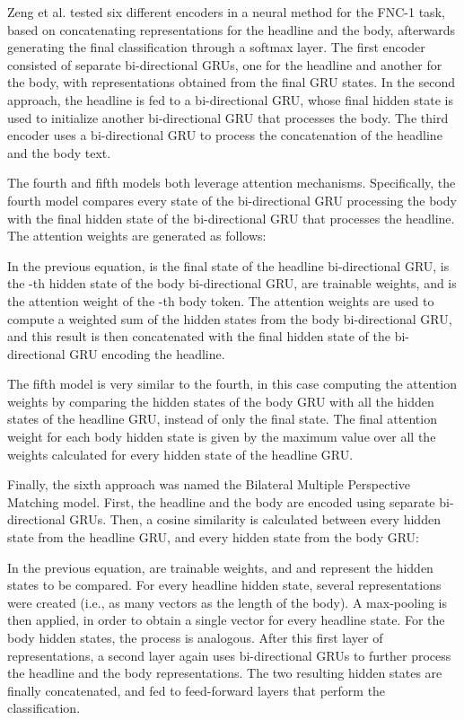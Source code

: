 Zeng et al. \cite{stanfordneural} tested six different encoders in a neural method for the FNC-1 task, based on concatenating representations for the headline and the body, afterwards generating the final classification through a softmax layer. The first encoder consisted of separate bi-directional GRUs, one for the headline and another for the body, with representations obtained from the final GRU states. In the second approach, the headline is fed to a bi-directional GRU, whose final hidden state is used to initialize another bi-directional GRU that processes the body. The third encoder uses a bi-directional GRU to process the concatenation of the headline and the body text.

The fourth and fifth models both leverage attention mechanisms. Specifically, the fourth model compares every state of the bi-directional GRU processing the body with the final hidden state of the bi-directional GRU that processes the headline. The attention weights are generated as follows:



In the previous equation,  is the final state of the headline bi-directional GRU,  is the -th hidden state of the body bi-directional GRU,  are trainable weights, and  is the attention weight of the -th body token. The attention weights are used to compute a weighted sum of the hidden states from the body bi-directional GRU, and this result is then concatenated with the final hidden state of the bi-directional GRU encoding the headline.

The fifth model is very similar to the fourth, in this case computing the attention weights by comparing the hidden states of the body GRU with all the hidden states of the headline GRU, instead of only the final state. The final attention weight for each body hidden state is given by the maximum value over all the weights calculated for every hidden state of the headline GRU.

Finally, the sixth approach was named the Bilateral Multiple Perspective Matching model. First, the headline and the body are encoded using separate bi-directional GRUs. Then, a cosine similarity is calculated between every hidden state from the headline GRU, and every hidden state from the body GRU:

In the previous equation,  are trainable weights, and  and  represent the hidden states to be compared. For every headline hidden state, several representations were created (i.e., as many  vectors as the length of the body). A max-pooling is then applied, in order to obtain a single vector for every headline state. For the body hidden states, the process is analogous. After this first layer of representations, a second layer again uses bi-directional GRUs to further process the headline and the body representations. The two resulting hidden states are finally concatenated, and fed to feed-forward layers that perform the classification.

